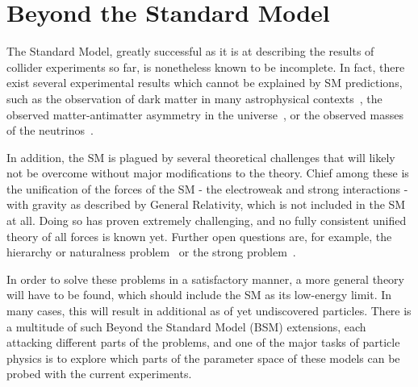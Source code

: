 



\section{Beyond the Standard Model}
\label{sec:theory:bsm}

The Standard Model, greatly successful as it is at describing the results of collider experiments so far, is nonetheless known to be incomplete. In fact, there exist several experimental results which cannot be explained by SM predictions, such as the observation of dark matter in many astrophysical contexts~\cite{Bertone:2004pz,Porter:2011nv,Arbey:2021gdg}, the observed matter-antimatter asymmetry in the universe~\cite{Dine:2003ax,Canetti:2012zc}, or the observed masses of the neutrinos~\cite{deGouvea:2016qpx,Dev:2023iyn}. 

In addition, the SM is plagued by several theoretical challenges that will likely not be overcome without major modifications to the theory. Chief among these is the unification of the forces of the SM - the electroweak and strong interactions - with gravity as described by General Relativity, which is not included in the SM at all. Doing so has proven extremely challenging, and no fully consistent unified theory of all forces is known yet. Further open questions are, for example, the hierarchy or naturalness problem~\cite{Nelson:1985,Koren:2020pio,Craig:2022eqo} or the strong \CP problem~\cite{Peccei:1977hh,Peccei:1977ur}.

In order to solve these problems in a satisfactory manner, a more general theory will have to be found, which should include the SM as its low-energy limit. In many cases, this will result in additional as of yet undiscovered particles. There is a multitude of such Beyond the Standard Model (BSM) extensions, each attacking different parts of the problems, and one of the major tasks of particle physics is to explore which parts of the parameter space of these models can be probed with the current experiments.

